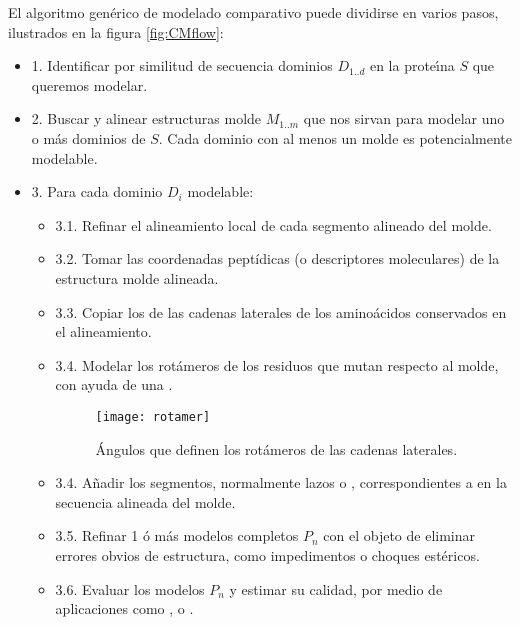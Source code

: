 El algoritmo gen\'{e}rico de modelado comparativo puede dividirse en varios pasos, ilustrados en la figura \ref{fig:CMflow}:
\begin{itemize}
\item{1.} Identificar por similitud de secuencia dominios $D_{1..d}$ en la prote\'\i{}na $S$ que queremos modelar.
\item{2.} Buscar y alinear estructuras molde $M_{1..m}$ que nos sirvan para modelar uno o m\'{a}s dominios de $S$. 
Cada dominio con al menos un molde es potencialmente modelable.
\item{3.} Para cada dominio $D_{i}$ modelable:
\begin{itemize}
\item{3.1.} Refinar el alineamiento local de cada segmento alineado del molde.
\item{3.2.} Tomar las coordenadas pept\'{i}dicas (o descriptores moleculares) de la estructura molde alineada.
\item{3.3.} Copiar los 
de las cadenas laterales de los amino\'{a}cidos conservados en el alineamiento.
\item{3.4.} Modelar los rot\'{a}meros de los residuos que mutan respecto al molde, 
con ayuda de una .
\begin{figure}
\begin{center} 
\texttt{[image: rotamer]}
\caption%
{
\'{A}ngulos que definen los rot\'{a}meros de las cadenas laterales.
}
\label{fig:rotamer}
\end{center}
\end{figure}
\item{3.4.} A\~nadir los segmentos, normalmente lazos o , %
correspondientes a  en la secuencia alineada del molde.
\item{3.5.} Refinar 1 \'{o} m\'{a}s modelos completos $P_{n}$ con el objeto de eliminar errores obvios de estructura, como impedimentos o choques est\'{e}ricos.
\item{3.6.} Evaluar los modelos $P_{n}$  y estimar su calidad, por medio de aplicaciones como 
,
 o 
.
\end{itemize}
\end{itemize}


